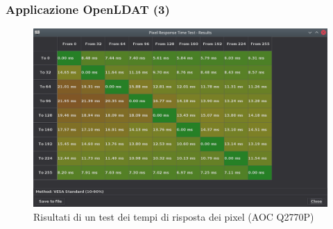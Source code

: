 \documentclass[xcolor={x11names}]{beamer}
\begin{document}
\begin{frame}[shrink=10]
	\frametitle{Applicazione OpenLDAT (3)}
	\begin{figure}
		\includegraphics[width=\textwidth]{Applicazione_files/gui_pixelresponse_results.png}
		\caption*{Risultati di un test dei tempi di risposta dei pixel (AOC Q2770P)}
	\end{figure}
\end{frame}
\end{document}
